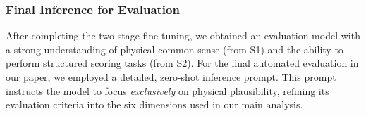 \subsubsection*{Final Inference for Evaluation}
After completing the two-stage fine-tuning, we obtained an evaluation model with a strong understanding of physical common sense (from S1) and the ability to perform structured scoring tasks (from S2). For the final automated evaluation in our paper, we employed a detailed, zero-shot inference prompt. This prompt instructs the model to focus \textit{exclusively} on physical plausibility, refining its evaluation criteria into the six dimensions used in our main analysis.

    
    
    
    
